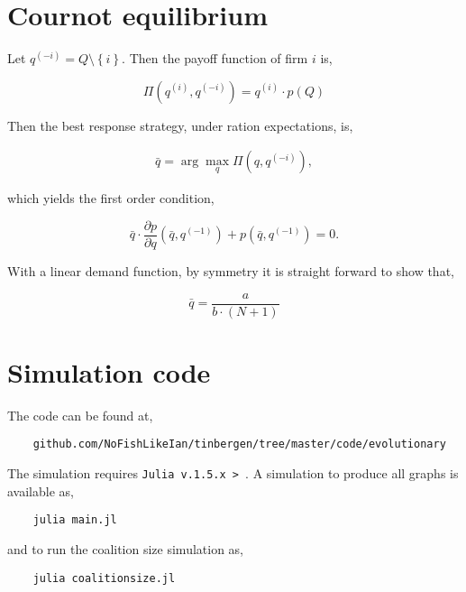 \documentclass[american]{scrartcl}
\newcommand{\set}[1]{\left\{#1\right\}}
\begin{document}
\newpage
\nocite{*}
\printbibliography

\newpage
\appendix

\section{Cournot equilibrium} \label{A:cournot}

Let $q^{(-i)} = Q \setminus \set{i}$. Then the payoff function of firm $i$ is,

\begin{equation*}
    \Pi\left(q^{(i)}, q^{(-i)} \right) = q^{(i)} \cdot p(Q)
\end{equation*}

Then the best response strategy, under ration expectations, is,

\begin{equation*}
    \begin{split}
        \bar{q} = \arg\max_{q} \Pi\left(q, q^{(-i)} \right),
    \end{split}
\end{equation*}

which yields the first order condition,

\begin{equation*}
    \bar{q} \cdot \frac{ \partial p}{\partial q}\left(\bar{q}, q^{(-1)}\right) + p\left(\bar{q}, q^{(-1)}\right) = 0.
\end{equation*}

With a linear demand function, by symmetry it is straight forward to show that,

\begin{equation*}
    \bar{q} = \frac{a}{b \cdot (N+1)}
\end{equation*}


\section{Simulation code} \label{A:code}

The code can be found at,

\begin{verbatim}
    github.com/NoFishLikeIan/tinbergen/tree/master/code/evolutionary
\end{verbatim}

The simulation requires \verb+Julia v.1.5.x > +. A simulation to produce all graphs is available as,

\begin{verbatim}
    julia main.jl
\end{verbatim}

and to run the coalition size simulation as,

\begin{verbatim}
    julia coalitionsize.jl
\end{verbatim}
\end{document}
